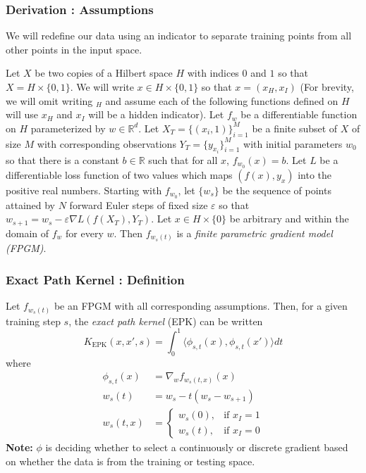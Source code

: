 \begin{frame}
  \frametitle{Derivation : Assumptions}

We will redefine our data using an indicator to separate training points from all other points in the input space.
 \begin{definition}
 \label{fpm}
 Let $X$ be two copies of a Hilbert space $H$ with indices $0$ and $1$ so that $X = H \times \{0,1\}$. We will write $x \in H \times \{0,1\}$ so that $x = (x_H, x_I)$ (For brevity, we will omit writing $_H$ and assume each of the following functions defined on $H$ will use $x_H$ and $x_I$ will be a hidden indicator).
 Let $ f_{w}$ be a differentiable function on $H$ parameterized by $w \in \mathbb{R}^d$. Let $X_T = \{(x_i, 1)\}_{i=1}^M$ be a finite subset of $X$ of size $M$ with corresponding observations $Y_T = \{y_{x_i}\}_{i=1}^M$ with initial parameters $w_0$ so that there is a constant $b \in \mathbb{R}$ such that for all $x$, $ f_{w_0}(x) = b$. Let $L$ be a differentiable loss function of two values which maps $(f(x), y_x)$ into the positive real numbers. Starting with $f_{w_0}$, let $\{w_s\}$ be the sequence of points attained by $N$ forward Euler steps of fixed size $\varepsilon$ so that $w_{s+1} = w_{s} - \varepsilon \nabla L(f(X_T), Y_T)$. Let $x \in H \times \{0\}$ be arbitrary and within the domain of $f_w$ for every $w$. Then $f_{w_s(t)}$ is a \emph{finite parametric gradient model (FPGM)}. 
 \end{definition}
\end{frame}
\begin{frame}
  \frametitle{Exact Path Kernel : Definition}
 \begin{definition}
 \label{epk}

 Let $f_{w_s(t)}$ be an FPGM with all corresponding assumptions. Then, for a given training step $s$, the \emph{exact path kernel} (EPK) can be written  
 \begin{equation}
  K_{\text{EPK}}(x, x', s) = \int_0^1\langle \phi_{s,t}(x), \phi_{s,t}(x')\rangle dt
  \label{eq2}
 \end{equation}
 where
 \begin{align}
 \phi_{s, t}(x) &=  \nabla_w f_{w_s(t,x)} (x)\\
 w_s(t) &= w_s - t(w_s - w_{s+1})\\
 w_s(t,x) &= \begin{cases} w_s(0), & \text{if } x_I = 1\\ w_s(t), & \text{if } x_I = 0 \end{cases}
 \end{align}
 \textbf{Note:} $\phi$ is deciding whether to select a continuously or
 discrete gradient based on whether the data is from the training or
 testing space.

 \end{definition}
\end{frame}
